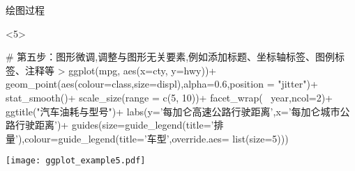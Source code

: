 \begin{frame}[c,fragile]{\subsecname}{绘图过程}
\begin{onlyenv}<5>
\begin{minipage}{\textwidth}
\begin{rcode}
# 第五步：图形微调,调整与图形无关要素,例如添加标题、坐标轴标签、图例标签、注释等
> ggplot(mpg, aes(x=cty, y=hwy))+
     geom_point(aes(colour=class,size=displ),alpha=0.6,position = "jitter")+  
     stat_smooth()+  
     scale_size(range = c(5, 10))+
     facet_wrap(~ year,ncol=2)+
     ggtitle("汽车油耗与型号")+  
     labs(y='每加仑高速公路行驶距离',x='每加仑城市公路行驶距离')+  
     guides(size=guide_legend(title='排量'),colour=guide_legend(title='车型',override.aes=
            list(size=5)))
\end{rcode}
\end{minipage}
\begin{minipage}{\textwidth}
\centering
\texttt{[image: ggplot\_example5.pdf]}
\end{minipage}
\end{onlyenv}

\end{frame}

